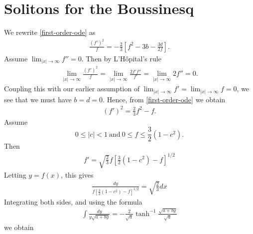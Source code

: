 \documentclass[12pt,reqno]{amsart}
\numberwithin{equation}{section}  %
\begin{document}
\section{Solitons for the Boussinesq} 
\label{sec:soliton}
We rewrite \eqref{first-order-ode} as
%
%
\begin{equation}
  \label{first-order-rewritten}
\begin{split}
  \frac{(f')^{2}}{f} = -\frac{2}{3}\left[ f^{2} - 3b -
  \frac{3d}{2f}\right].
\end{split}
\end{equation}
%
%
Assume $\lim_{|x| \to \infty} f'' =0$. Then by L'H\^opital's rule
%
%
\begin{equation*}
\begin{split}
  \lim_{|x| \to \infty} \frac{(f')^{2}}{f} = \lim_{|x| \to \infty} \frac{2f'
  f''}{f'} = \lim_{|x| \to \infty} 2f'' = 0.
\end{split}
\end{equation*}
%
%
Coupling this with our earlier assumption of $\lim_{| x | \to \infty} f' = \lim_{| x
| \to \infty} f = 0$, we see that we must have $b =d=0$. Hence, from 
\eqref{first-order-ode} we obtain 
%
%
\begin{equation}
  \label{bous-ode-simp}
\begin{split}
  (f')^{2} = \frac{2}{3} f^{2} - f. 
\end{split}
\end{equation}
%
%
Assume $$0 \le |c| < 1 \ \text{and} \ 0 \le f \le \frac{3}{2}(1-c^{2}).$$ 
%
%
Then
%
%
\begin{equation*}
\begin{split}
  f' = \sqrt{\frac{2}{3}}f \left[ \frac{3}{2}(1 - c^{2}) -f \right]^{1/2}
\end{split}
\end{equation*}
%
%
Letting $y = f(x)$, this gives
%
%
\begin{equation*}
\begin{split}
\frac{dy}{ f \left[ \frac{3}{2}(1 - c^{2}) -f \right]^{1/2}} = \sqrt{\frac{2}{3}}
dx
\end{split}
\end{equation*}
%
%
Integrating both sides, and using the formula
%
%
\begin{equation*}
\begin{split}
  \int \frac{dy}{y \sqrt{a + by}} = -\frac{2}{ \sqrt{a}} \tanh^{-1}
  \frac{\sqrt{a+ by}}{ \sqrt{a}}
\end{split}
\end{equation*}
%
%
we obtain
\end{document}
